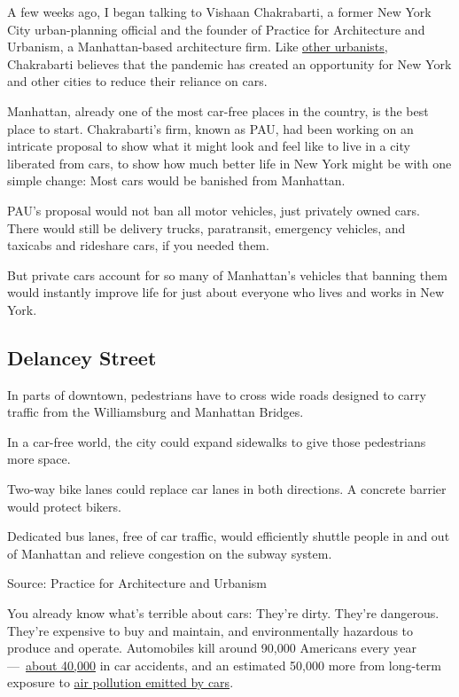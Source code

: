 A few weeks ago, I began talking to Vishaan Chakrabarti, a former New
York City urban-planning official and the founder of Practice for
Architecture and Urbanism, a Manhattan-based architecture firm. Like
\href{https://www.nytimes.com/2020/06/20/opinion/pandemic-automobile-cities.html?action=click\&module=Opinion\&pgtype=Homepage}{other
urbanists}, Chakrabarti believes that the pandemic has created an
opportunity for New York and other cities to reduce their reliance on
cars.

Manhattan, already one of the most car-free places in the country, is
the best place to start. Chakrabarti's firm, known as PAU, had been
working on an intricate proposal to show what it might look and feel
like to live in a city liberated from cars, to show how much better life
in New York might be with one simple change: Most cars would be banished
from Manhattan.

PAU's proposal would not ban all motor vehicles, just privately owned
cars. There would still be delivery trucks, paratransit, emergency
vehicles, and taxicabs and rideshare cars, if you needed them.

But private cars account for so many of Manhattan's vehicles that
banning them would instantly improve life for just about everyone who
lives and works in New York.

\hypertarget{delancey-street}{%
\subsection{Delancey Street}\label{delancey-street}}

In parts of downtown, pedestrians have to cross wide roads designed to
carry traffic from the Williamsburg and Manhattan Bridges.

In a car-free world, the city could expand sidewalks to give those
pedestrians more space.

Two-way bike lanes could replace car lanes in both directions. A
concrete barrier would protect bikers.

Dedicated bus lanes, free of car traffic, would efficiently shuttle
people in and out of Manhattan and relieve congestion on the subway
system.

Source: Practice for Architecture and Urbanism

You already know what's terrible about cars: They're dirty. They're
dangerous. They're expensive to buy and maintain, and environmentally
hazardous to produce and operate. Automobiles kill around 90,000
Americans every year
---~\href{https://ohsonline.com/articles/2019/02/18/nsc-motor-vehicle-deaths.aspx\#:~:text=National\%20Safety\%20Council.-,NSC\%20estimates\%20that\%20in\%202018\%2C\%2040\%2C000\%20people\%20died\%20in\%20car,percent\%20decrease\%20from\%202017\%20figures.}{about
40,000} in car accidents, and an estimated 50,000 more from long-term
exposure to
\href{https://www.sciencedirect.com/science/article/abs/pii/S1352231013004548}{air
pollution emitted by cars}.

